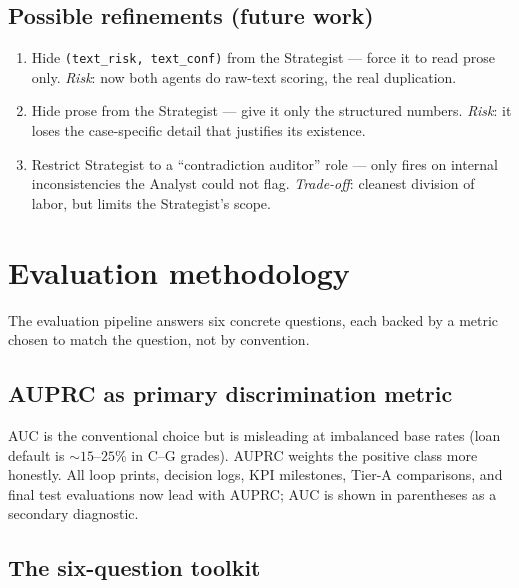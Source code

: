 \documentclass[11pt,a4paper]{article}
\begin{document}
\subsection{Possible refinements (future work)}

\begin{enumerate}[itemsep=0pt]
    \item Hide \texttt{(text\_risk, text\_conf)} from the Strategist --- force
          it to read prose only. \emph{Risk}: now both agents do raw-text
          scoring, the real duplication.
    \item Hide prose from the Strategist --- give it only the structured numbers.
          \emph{Risk}: it loses the case-specific detail that justifies its existence.
    \item Restrict Strategist to a ``contradiction auditor'' role --- only fires
          on internal inconsistencies the Analyst could not flag. \emph{Trade-off}:
          cleanest division of labor, but limits the Strategist's scope.
\end{enumerate}

\section{Evaluation methodology}
\label{sec:eval}

The evaluation pipeline answers six concrete questions, each backed by a
metric chosen to match the question, not by convention.

\subsection{AUPRC as primary discrimination metric}

AUC is the conventional choice but is misleading at imbalanced base
rates (loan default is $\sim 15$--$25\%$ in C--G grades). AUPRC weights
the positive class more honestly. All loop prints, decision logs, KPI
milestones, Tier-A comparisons, and final test evaluations now lead with
AUPRC; AUC is shown in parentheses as a secondary diagnostic.

\subsection{The six-question toolkit}
\end{document}
